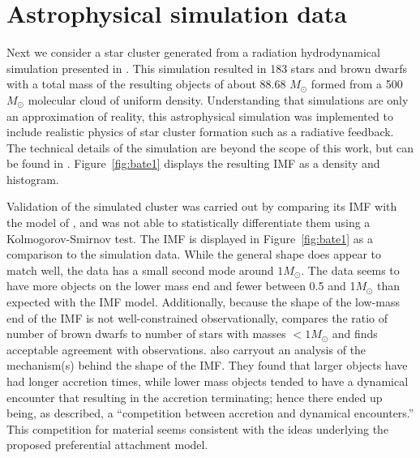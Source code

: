 \documentclass[12pt]{article}
\newcommand{\Msun}{M_{\odot}}
\begin{document}
\section{Astrophysical simulation data} \label{sec:bate}

Next we consider a star cluster generated from a radiation hydrodynamical simulation presented in \cite{Bate2012}.  This simulation resulted in 183 stars and brown dwarfs with a total mass of the resulting objects of about 88.68 $\Msun$ formed from a 500 $\Msun$ molecular cloud of uniform density.  
Understanding that simulations are only an approximation of reality, this astrophysical simulation was implemented to include realistic physics of star cluster formation such as a radiative feedback. 
The technical details of the simulation are beyond the scope of this work, but can be found in \cite{Bate2012}.
Figure~\ref{fig:bate1} displays the resulting IMF as a density and histogram.
%

Validation of the simulated cluster was carried out by comparing its IMF with the model of \cite{chabrier2005}, and was not able to statistically differentiate them using a Kolmogorov-Smirnov test.  The \cite{chabrier2005} IMF is displayed in Figure~\ref{fig:bate1} as a comparison to the simulation data.  While the general shape does appear to match well, the \cite{Bate2012} data has a small second mode around $1\Msun$.  The \cite{Bate2012} data seems to have more objects on the lower mass end and fewer between 0.5 and 1$\Msun$ than expected with the \cite{chabrier2005} IMF model.
%
Additionally, because the shape of the low-mass end of the IMF is not well-constrained observationally,  \cite{Bate2012} compares the ratio of number of brown dwarfs to number of stars with masses $<1\Msun$ and finds acceptable agreement with observations. 
%
\cite{Bate2012} also carryout an analysis of the mechanism(s) behind the shape of the IMF.  
They found that larger objects have had longer accretion times, while lower mass objects tended to have a dynamical encounter that resulting in the accretion terminating; hence there ended up being, as \cite{Bate2012} described, a ``competition between accretion and dynamical encounters.''  This competition for material seems consistent with the ideas underlying the proposed preferential attachment model.
\end{document}
